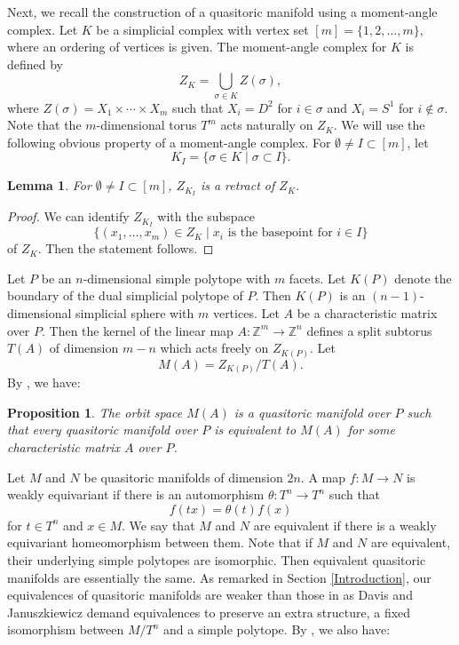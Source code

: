 \documentclass[a4paper]{amsart}
\numberwithin{equation}{section}
\newtheorem{proposition}[theorem]{Proposition}
\newtheorem{lemma}[theorem]{Lemma}
\theoremstyle{definition}
\theoremstyle{remark}
\numberwithin{equation}{section}
\newcommand{\Z}{\mathbb{Z}}
\begin{document}
Next, we recall the construction of a quasitoric manifold using a moment-angle complex. Let $K$ be a simplicial complex with vertex set $[m]=\{1,2,\ldots,m\}$, where an ordering of vertices is given. The moment-angle complex for $K$ is defined by
\[
  Z_K=\bigcup_{\sigma\in K}Z(\sigma),
\]
where $Z(\sigma)=X_1\times\cdots\times X_m$ such that $X_i=D^2$ for $i\in\sigma$ and $X_i=S^1$ for $i\not\in\sigma$. Note that the $m$-dimensional torus $T^m$ acts naturally on $Z_K$. We will use the following obvious property of a moment-angle complex. For $\emptyset\ne I\subset[m]$, let
\[
  K_I=\{\sigma\in K\mid\sigma\subset I\}.
\]



\begin{lemma}
  \label{retract}
  For $\emptyset\ne I\subset[m]$, $Z_{K_I}$ is a retract of $Z_K$.
\end{lemma}

\begin{proof}
  We can identify $Z_{K_I}$ with the subspace
  \[
    \{(x_1,\ldots,x_m)\in Z_K\mid x_i\text{ is the basepoint for }i\in I\}
  \]
  of $Z_K$. Then the statement follows.
\end{proof}



Let $P$ be an $n$-dimensional simple polytope with $m$ facets. Let $K(P)$ denote the boundary of the dual simplicial polytope of $P$. Then $K(P)$ is an $(n-1)$-dimensional simplicial sphere with $m$ vertices. Let $A$ be a characteristic matrix over $P$. Then the kernel of the linear map $A\colon\Z^m\to\Z^n$ defines a split subtorus $T(A)$ of dimension $m-n$ which acts freely on $Z_{K(P)}$. Let
\[
  M(A)=Z_{K(P)}/T(A).
\]
By \cite{DJ}, we have:



\begin{proposition}
  \label{M(A)}
  The orbit space $M(A)$ is a quasitoric manifold over $P$ such that every quasitoric manifold over $P$ is equivalent to $M(A)$ for some characteristic matrix $A$ over $P$.
\end{proposition}



Let $M$ and $N$ be quasitoric manifolds of dimension $2n$. A map $f\colon M\to N$ is weakly equivariant if there is an automorphism $\theta\colon T^n\to T^n$ such that
\[
  f(tx)=\theta(t)f(x)
\]
for $t\in T^n$ and $x\in M$. We say that $M$ and $N$ are equivalent if there is a weakly equivariant homeomorphism between them. Note that if $M$ and $N$ are equivalent, their underlying simple polytopes are isomorphic. Then equivalent quasitoric manifolds are essentially the same. As remarked in Section \ref{Introduction}, our equivalences of quasitoric manifolds are weaker than those in \cite{DJ} as Davis and Januszkiewicz demand equivalences to preserve an extra structure, a fixed isomorphism between $M/T^n$ and a simple polytope. By \cite{DJ}, we also have:
\end{document}
